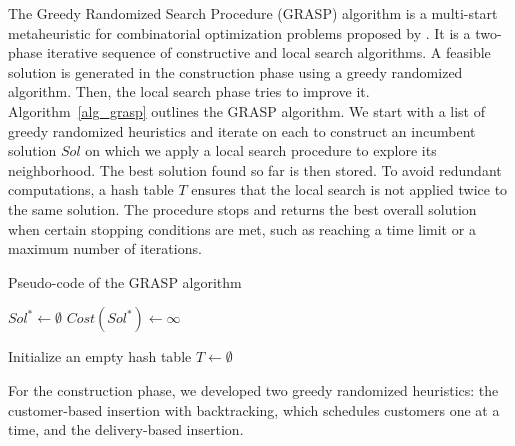 \documentclass{article}
\begin{document}
The Greedy Randomized Search Procedure (GRASP) algorithm is a multi-start metaheuristic for combinatorial optimization problems proposed by \cite{feo1989probabilistic}. It is a two-phase iterative sequence of constructive and local search algorithms. A feasible solution is generated in the construction phase using a greedy randomized algorithm. Then, the local search phase tries to improve it. Algorithm~\ref{alg_grasp} outlines the GRASP algorithm. We start with a list of greedy randomized heuristics and iterate on each to construct an incumbent solution $Sol$ on which we apply a local search procedure to explore its neighborhood. The best solution found so far is then stored. To avoid redundant computations, a hash table $T$ ensures that the local search is not applied twice to the same solution. The procedure stops and returns the best overall solution when certain stopping conditions are met, such as reaching a time limit or a maximum number of iterations. 
    \begin{algorithm}[hbpt]
        \caption{Pseudo-code of the GRASP algorithm }
        \label{alg_grasp}
        \DontPrintSemicolon
        \LinesNumbered
        \setcounter{AlgoLine}{0}
        $Sol^{*} \leftarrow \emptyset$    \hspace{2mm}        $Cost(Sol^*) \leftarrow \infty$

        Initialize an empty hash table $T \leftarrow \emptyset$



    \end{algorithm}
            
For the construction phase, we developed two greedy randomized heuristics: the customer-based insertion with backtracking, which schedules customers one at a time, and the delivery-based insertion.%
\end{document}
